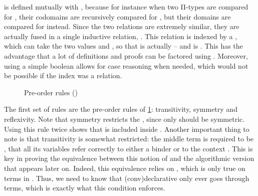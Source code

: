  is defined mutually with , because for instance when two Π-types
are compared for , their codomains are recursively compared for ,
but their domains are compared for  instead.%
Since the two relations are extremely similar, they are actually fused in a single
inductive relation, .
\AP This relation is indexed by a  , which can take
the two values  and , so that 
is actually  – and  is
. This has the advantage that a lot of definitions and proofs
can be factored using . Moreover, using a simple boolean allows for case reasoning
when needed, which would not be possible if the index was \eg a relation.%

\begin{figure}[h]
  \ContinuedFloat*
  \caption{Pre-order rules ()}
  \label{fig:meta-cumul-struct}
\end{figure}

\AP The first set of rules are the pre-order rules of \cref{fig:meta-cumul-struct}:
transitivity, symmetry and reflexivity. Note that symmetry restricts the ,
since only  should be symmetric. Using this rule twice shows that 
 is included inside .
Another important thing to note is that transitivity is somewhat restricted:
the middle term is required to be ,%
\ie that all its variables refer correctly
to either a binder or to the context .
This is key in proving the equivalence between this notion of  and the
algorithmic version that appears later on. Indeed, this equivalence relies on ,
which is only true on  terms in . Thus, we need to know that
\kl(conv){declarative}  only ever goes through  terms,
which is exactly what this condition enforces.

